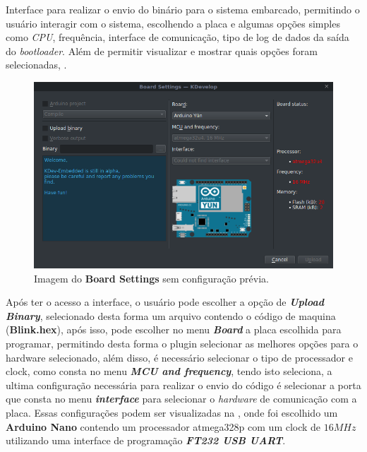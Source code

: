 Interface para realizar o envio do binário para o sistema embarcado, permitindo o usuário interagir com o sistema, escolhendo a placa e algumas opções simples como \textit{CPU}, frequência, interface de comunicação, tipo de log de dados da saída do \textit{bootloader}. Além de permitir visualizar e mostrar quais opções foram selecionadas, .

\begin{figure}[!htb]
  \centering
  \caption[Board Settings com configuração inicial]{Imagem do \textbf{Board Settings} sem configuração prévia.}
  \label{fig:boardsettings}
  \includegraphics[width=1\textwidth]{figuras/boardsettings.png}
\end{figure}

Após ter o acesso a interface, o usuário pode escolher a opção de \textbf{\textit{Upload Binary}}, selecionado desta forma um arquivo contendo o código de maquina (\textbf{Blink.hex}), após isso, pode escolher no menu \textbf{\textit{Board}} a placa escolhida para programar, permitindo desta forma o plugin selecionar as melhores opções para o hardware selecionado, além disso, é necessário selecionar o tipo de processador e clock, como consta no menu \textbf{\textit{MCU and frequency}}, tendo isto seleciona, a ultima configuração necessária para realizar o envio do código é selecionar a porta que consta no menu \textbf{\textit{interface}} para selecionar o \textit{hardware} de comunicação com a placa. Essas configurações podem ser visualizadas na , onde foi escolhido um \textbf{Arduino Nano} contendo um processador atmega328p com um clock de $16MHz$ utilizando uma interface de programação \textbf{\textit{FT232 USB UART}}.

